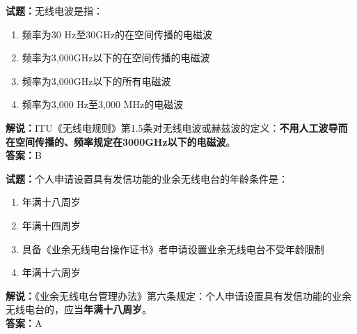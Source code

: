 \documentclass{ctexbook}
\begin{document}

\bigskip

\noindent\textbf{试题：}无线电波是指：
\begin{enumerate}[leftmargin=3em]
  \item 频率为30 \si{Hz}至30\unit{\GHz}的在空间传播的电磁波
  \item 频率为3,000\unit{\GHz}以下的在空间传播的电磁波
  \item 频率为3,000\unit{\GHz}以下的所有电磁波
  \item 频率为3,000 \si{Hz}至3,000 \unit{\MHz}的电磁波
\end{enumerate}
\noindent\textbf{解说：}ITU《无线电规则》第1.5条对无线电波或赫兹波的定义：\textbf{不用人工波导而在空间传播的、频率规定在3000\unit{\GHz}以下的电磁波}。\\\noindent\textbf{答案：}B

\bigskip

\noindent\textbf{试题：}个人申请设置具有发信功能的业余无线电台的年龄条件是：
\begin{enumerate}[leftmargin=3em]
  \item 年满十八周岁
  \item 年满十四周岁
  \item 具备《业余无线电台操作证书》者申请设置业余无线电台不受年龄限制
  \item 年满十六周岁
\end{enumerate}
\noindent\textbf{解说：}《业余无线电台管理办法》第六条规定：个人申请设置具有发信功能的业余无线电台的，应当\textbf{年满十八周岁}。\\\noindent\textbf{答案：}A

\bigskip
\end{document}
